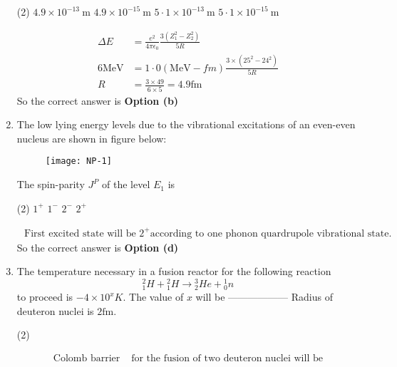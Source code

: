 \begin{enumerate}
  \begin{tasks}(2)
 	\task[\textbf{a.}] $4.9 \times 10^{-13} \mathrm{~m}$
 	\task[\textbf{b.}]$4.9 \times 10^{-15} \mathrm{~m}$
 	\task[\textbf{c.}]$5 \cdot 1 \times 10^{-13} \mathrm{~m}$
 	\task[\textbf{d.}] $5 \cdot 1 \times 10^{-15} \mathrm{~m}$	
 \end{tasks}
\begin{answer}
	$$
	\begin{aligned}
	\Delta E&=\frac{e^2}{4 \pi \epsilon_0} \frac{3\left(Z_1^2-Z_2^2\right)}{5 R}\\
	6 \mathrm{MeV}&=1 \cdot 0(\mathrm{MeV}-f m) \frac{3 \times\left(25^2-24^2\right)}{5 R}\\
	R&=\frac{3 \times 49}{6 \times 5}=4.9 \mathrm{fm}
\end{aligned}
$$
So the correct answer is \textbf{Option (b)}
\end{answer}
\item  The low lying energy levels due to the vibrational excitations of an even-even nucleus are shown in figure below:
\begin{figure}[H]
	\centering
	\texttt{[image: NP-1]}
\end{figure}
	The spin-parity $J^P$ of the level $E_1$ is
	 \begin{tasks}(2)
		\task[\textbf{a.}]$1^{+}$
		\task[\textbf{b.}]$1^{-}$
		\task[\textbf{c.}]$2^{-}$
		\task[\textbf{d.}]$2^{+}$
	\end{tasks}
\begin{answer}
	$$
	\begin{aligned}
	\text { First excited state will be } 2^{+} \text {according to one phonon quardrupole vibrational state. }
\end{aligned}
$$
So the correct answer is \textbf{Option (d)}
\end{answer}
	\item The temperature necessary in a fusion reactor for the following reaction
$$
{ }_1^2 H+{ }_1^2 H \rightarrow{ }_2^3 H e+{ }_0^1 n
$$
to proceed is $-4 \times 10^x K$. The value of $x$ will be ------------------ Radius of deuteron nuclei is $2 \mathrm{fm}$.	
 \begin{tasks}(2)
\end{tasks}
\begin{answer}
	$$
	\begin{aligned}
	\text{Colomb barrier }&\text{for the fusion of two deuteron nuclei will be}\\

\end{aligned}$$
\end{answer}
\end{enumerate}
